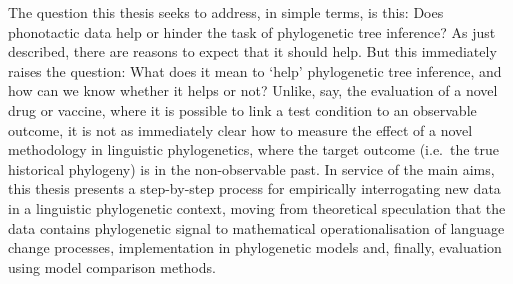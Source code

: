 The question this thesis seeks to address, in simple terms, is this: Does phonotactic data help or hinder the task of phylogenetic tree inference? As just described, there are reasons to expect that it should help. But this immediately raises the question: What does it mean to `help' phylogenetic tree inference, and how can we know whether it helps or not? Unlike, say, the evaluation of a novel drug or vaccine, where it is possible to link a test condition to an observable outcome, it is not as immediately clear how to measure the effect of a novel methodology in linguistic phylogenetics, where the target outcome (i.e.~the true historical phylogeny) is in the non-observable past. In service of the main aims, this thesis presents a step-by-step process for empirically interrogating new data in a linguistic phylogenetic context, moving from theoretical speculation that the data contains phylogenetic signal to mathematical operationalisation of language change processes, implementation in phylogenetic models and, finally, evaluation using model comparison methods.

